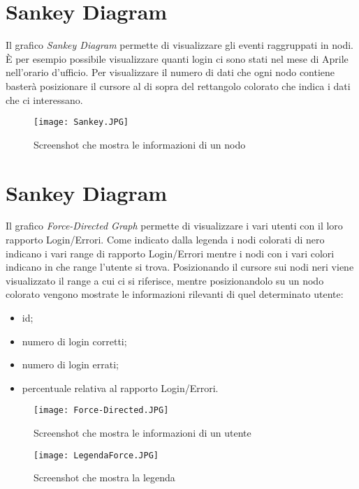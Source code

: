 \section{Sankey Diagram}
Il grafico \textit{Sankey Diagram} permette di visualizzare gli eventi raggruppati in nodi.
È per esempio possibile visualizzare quanti login ci sono stati nel mese di Aprile nell'orario d'ufficio.
Per visualizzare il numero di dati che ogni nodo contiene basterà posizionare il cursore al di sopra del rettangolo colorato che indica i dati che ci interessano.

\begin{figure}[H]
    \texttt{[image: Sankey.JPG]}
    \caption{Screenshot che mostra le informazioni di un nodo}
\end{figure}

\section{Sankey Diagram}
Il grafico \textit{Force-Directed Graph} permette di visualizzare i vari utenti con il loro rapporto Login/Errori.
Come indicato dalla legenda i nodi colorati di nero indicano i vari range di rapporto Login/Errori mentre i nodi con i vari colori indicano in che range l'utente si trova.
Posizionando il cursore sui nodi neri viene visualizzato il range a cui ci si riferisce, mentre posizionandolo su un nodo colorato vengono mostrate le informazioni rilevanti di quel determinato utente:
\begin{itemize}
  \item id;
  \item numero di login corretti;
  \item numero di login errati;
  \item percentuale relativa al rapporto Login/Errori.
\end{itemize}

\begin{figure}[H]
    \texttt{[image: Force-Directed.JPG]}
    \caption{Screenshot che mostra le informazioni di un utente}
\end{figure}
\begin{figure}[H]
    \centering
    \texttt{[image: LegendaForce.JPG]}
    \caption{Screenshot che mostra la legenda}
\end{figure}
